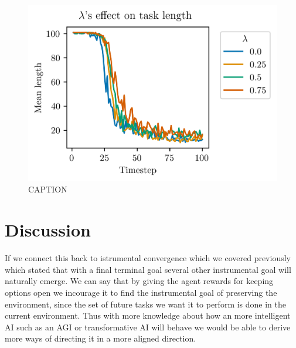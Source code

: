\documentclass[12pt,A4]{report}
\theoremstyle{definition}
\begin{document}
\begin{figure}[H]
  \hspace{60pt} \includegraphics{"./figures/static_8x8_results_avg_len.png"}
  \caption{CAPTION}
  \label{fig:results_static_8x8}
\end{figure}



\chapter{Discussion}
If we connect this back to istrumental convergence which we covered previously which stated that with a final terminal goal several other instrumental goal will naturally emerge. We can say that by giving the agent rewards for keeping options open we incourage it to find the instrumental goal of preserving the environment, since the set of future tasks we want it to perform is done in the current environment. Thus with more knowledge about how an more intelligent AI such as an AGI or transformative AI will behave we would be able to derive more ways of directing it in a more aligned direction.


\end{document}
